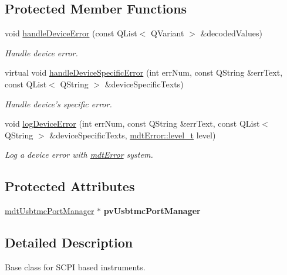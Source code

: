 \subsection*{Protected Member Functions}
\begin{DoxyCompactItemize}
\item 
void \hyperlink{classmdt_device_scpi_a16b6b0c77b1078da285f9d8d9ba52181}{handleDeviceError} (const QList$<$ QVariant $>$ \&decodedValues)
\begin{DoxyCompactList}\small\item\em Handle device error. \end{DoxyCompactList}\item 
virtual void \hyperlink{classmdt_device_scpi_af1cc7d9c99832fa3a7b3c5764588c637}{handleDeviceSpecificError} (int errNum, const QString \&errText, const QList$<$ QString $>$ \&deviceSpecificTexts)
\begin{DoxyCompactList}\small\item\em Handle device's specific error. \end{DoxyCompactList}\item 
void \hyperlink{classmdt_device_scpi_a00d25c16acb20c909210bc5278f713fa}{logDeviceError} (int errNum, const QString \&errText, const QList$<$ QString $>$ \&deviceSpecificTexts, \hyperlink{classmdt_error_a5c8b1a040e2feaa848f6201d6b6f0cd7}{mdtError::level\_\-t} level)
\begin{DoxyCompactList}\small\item\em Log a device error with \hyperlink{classmdt_error}{mdtError} system. \end{DoxyCompactList}\end{DoxyCompactItemize}
\subsection*{Protected Attributes}
\begin{DoxyCompactItemize}
\item 
\hypertarget{classmdt_device_scpi_a6f7bd859a14eddbaab64f492777c1337}{
\hyperlink{classmdt_usbtmc_port_manager}{mdtUsbtmcPortManager} $\ast$ {\bfseries pvUsbtmcPortManager}}
\label{classmdt_device_scpi_a6f7bd859a14eddbaab64f492777c1337}

\end{DoxyCompactItemize}


\subsection{Detailed Description}
Base class for SCPI based instruments. 

